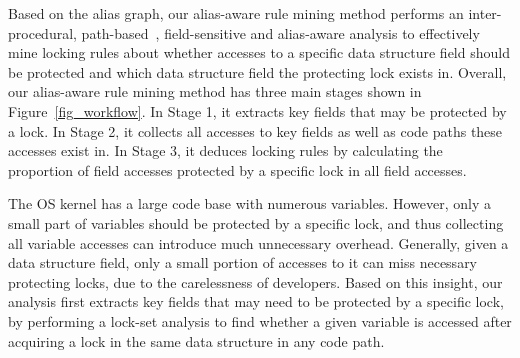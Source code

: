 Based on the alias graph, our alias-aware rule mining method performs an 
inter-procedural, path-based~\cite{Li:ASPLOS22}, field-sensitive and 
alias-aware analysis to effectively mine locking rules about whether accesses 
to a specific data structure field should be protected and which data structure 
field the protecting lock exists in. Overall, our alias-aware rule mining 
method has three main stages shown in Figure~\ref{fig_workflow}. In Stage 1, it 
extracts key fields that may be protected by a lock. In Stage 2, it collects 
all accesses to key fields as well as code paths these accesses exist in. In 
Stage 3, it deduces locking rules by calculating the proportion of field 
accesses protected by a specific lock in all field accesses. 

 The OS kernel has a large code base with 
numerous variables. However, only a small part of variables should be protected 
by a specific lock, and thus collecting all variable accesses can introduce 
much unnecessary overhead. Generally, given a data structure field, only a 
small portion of accesses to it can miss necessary protecting locks, due to the 
carelessness of developers. Based on this insight, our analysis first extracts 
key fields that may need to be protected by a specific lock, by performing a 
lock-set analysis to find whether a given variable is accessed after acquiring 
a lock in the same data structure in any code path.

